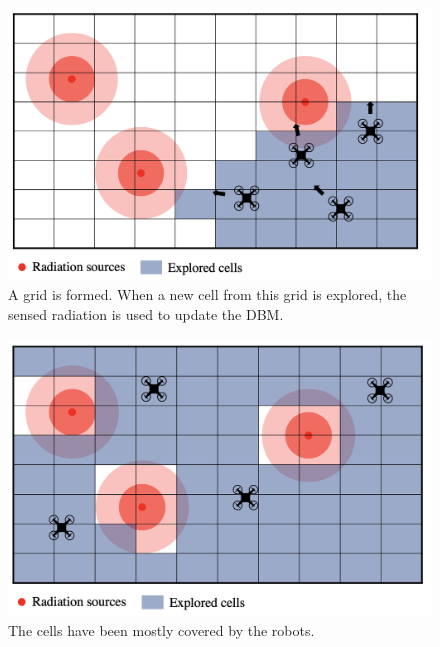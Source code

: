 \begin{figure}
     \includegraphics[width=16cm]{figures/dora_explorer/risk_aware_b.png}
     \caption[Risk-awareness intuition (2)]{A grid is formed. When a new cell from this grid is explored, the sensed radiation is used to update the \ac{DBM}.}
     \label{risk_aware_b}
\end{figure}

\begin{figure}
     \includegraphics[width=16cm]{figures/dora_explorer/risk_aware_c.png}
     \caption[Risk-awareness intuition (3)]{The cells have been mostly covered by the robots.}
     \label{risk_aware_c}
\end{figure}

